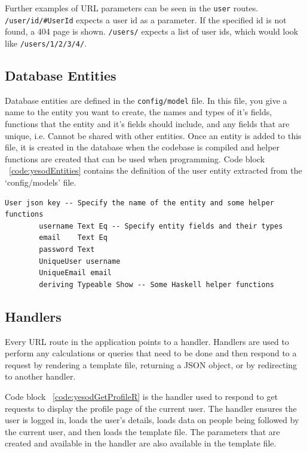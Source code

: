Further examples of URL parameters can be seen in the \texttt{user} routes. 
\texttt{/user/id/\#UserId} expects a user id as a parameter. If the specified
id is not found, a 404 page is shown. \texttt{/users/\*[UserId]} expects a list
of user ids, which would look like \texttt{/users/1/2/3/4/}.

\subsection{Database Entities}

Database entities are defined in the \texttt{config/model} file. In this file, you
give a name to the entity you want to create, the names and types of it's
fields, functions that the entity and it's fields should include, and
any fields that are unique, i.e. Cannot be shared with other entities.
Once an entity is added to this file, it is created in the database
when the codebase is compiled and helper functions are created that
can be used when programming. Code block ~\ref{code:yesodEntities} contains
the definition of the user entity extracted from the `config/models' file.

\begin{lstlisting}[caption={Yesod Database Entities},label={code:yesodEntities}]
	User json key -- Specify the name of the entity and some helper functions
		username Text Eq -- Specify entity fields and their types
		email    Text Eq
		password Text
		UniqueUser username
		UniqueEmail email
		deriving Typeable Show -- Some Haskell helper functions
\end{lstlisting}

\subsection{Handlers}

Every URL route in the application points to a handler.
Handlers are used to perform any calculations or queries 
that need to be done and then respond to a request by rendering a template file, 
returning a JSON object, or by redirecting to another handler.

Code block ~\ref{code:yesodGetProfileR} is the handler used to respond to get requests
to display the profile page of the current user. The handler ensures the user is logged in,
loads the user's details, loads data on people being followed by the current user,
and then loads the template file. The parameters that are created and available
in the handler are also available in the template file.

